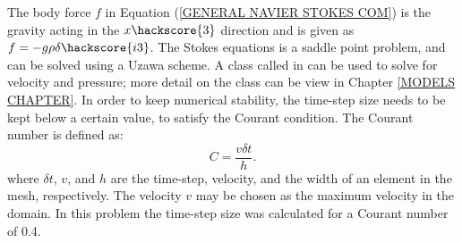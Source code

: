 %
The body force $f$ in Equation (\ref{GENERAL NAVIER STOKES COM}) is the gravity acting in the $x\hackscore{3}$ direction and is given as $f = -g \rho \delta\hackscore{i3}$.
The Stokes equations is a saddle point problem, and can be solved using a Uzawa scheme. A class called  in \escript can be used to solve for velocity and pressure; more detail on the class can be view in Chapter \ref{MODELS CHAPTER}.
In order to keep numerical stability, the time-step size needs to be kept below a certain value, to satisfy the Courant condition. The Courant number is defined as:
%
\begin{equation}
C = \frac{v \delta t}{h}.
\label{COURANT}
\end{equation}
%
where $\delta t$, $v$, and $h$ are the time-step, velocity, and the width of an element in the mesh, respectively. The velocity $v$ may be chosen as the maximum velocity in the domain. In this problem the time-step size was calculated for a Courant number of 0.4.

